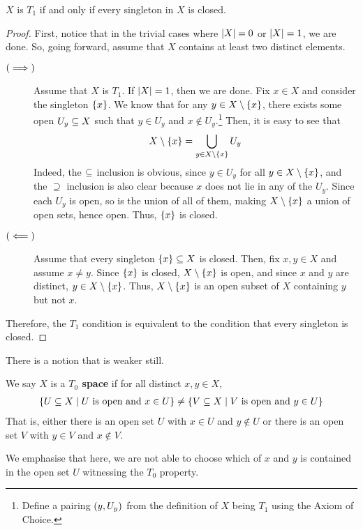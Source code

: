 \begin{boxproposition}
    $X$ is $T_1$ if and only if every singleton in $X$ is closed.
\end{boxproposition}
\begin{proof}
    First, notice that in the trivial cases where $\left\lvert X \right\rvert = 0$ or $\left\lvert X \right\rvert = 1$, we are done. So, going forward, assume that $X$ contains at least two distinct elements.
    \begin{description}
        \item[$\left( \implies \right)$] 
        Assume that $X$ is $T_1$. If $\left\lvert X \right\rvert = 1$, then we are done. Fix $x \in X$ and consider the singleton $\left\{ x \right\}$. We know that for any $y \in X \setminus \left\{ x \right\}$, there exists some open $U_y \subseteq X$ such that $y \in U_y$ and $x \notin U_y$.\footnote{Define a pairing $\left( y, U_y \right)$ from the definition of $X$ being $T_1$ using the Axiom of Choice.} Then, it is easy to see that
        \begin{align*}
            X \setminus \left\{ x \right\} = \bigcup_{y \in X \setminus \left\{ x \right\}} U_y
        \end{align*}
        Indeed, the $\subseteq$ inclusion is obvious, since $y \in U_y$ for all $y \in X \setminus \left\{ x \right\}$, and the $\supseteq$ inclusion is also clear because $x$ does not lie in any of the $U_y$. Since each $U_y$ is open, so is the union of all of them, making $X \setminus \left\{ x \right\}$ a union of open sets, hence open. Thus, $\left\{ x \right\}$ is closed.

        \item[$\left( \impliedby \right)$]
        Assume that every singleton $\left\{ x \right\} \subseteq X$ is closed. Then, fix $x, y \in X$ and assume $x \neq y$. Since $\left\{ x \right\}$ is closed, $X \setminus \left\{ x \right\}$ is open, and since $x$ and $y$ are distinct, $y \in X \setminus \left\{ x \right\}$. Thus, $X \setminus \left\{ x \right\}$ is an open subset of $X$ containing $y$ but not $x$.
    \end{description}
    Therefore, the $T_1$ condition is equivalent to the condition that every singleton is closed.
\end{proof}

There is a notion that is weaker still.

\begin{boxdefinition}[$T_0$ property]
    We say $X$ is a \textbf{$T_0$ space} if for all distinct $x, y \in X$,
    \begin{align*}
        \left\{ U \subseteq X \; \middle\vert \; U \text{ is open and } x \in U \right\}
        \neq
        \left\{ V \subseteq X \; \middle\vert \; V \text{ is open and } y \in U \right\}
    \end{align*}
    That is, either there is an open set $U$ with $x \in U$ and $y \notin U$ or there is an open set $V$ with $y \in V$ and $x \notin V$.
\end{boxdefinition}
\begin{remark}
    We emphasise that here, we are not able to choose which of $x$ and $y$ is contained in the open set $U$ witnessing the $T_0$ property.
\end{remark}

